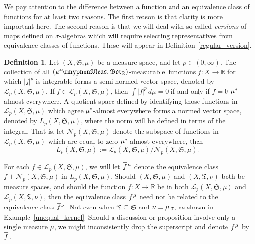 \documentclass[
twoside=true,
paper=letter,
fontsize=9pt,
pagesize=auto,
leqno,
openany,
headsepline,
overfullrule,
]{scrbook}
\theoremstyle{plain}
\theoremstyle{plain}
\theoremstyle{definition}
\newtheorem{defn}[thm]{Definition}
\theoremstyle{bfnoteitalic}
\theoremstyle{bfnoteroman}
\newcommand{\sigalg}[1]{\mathfrak{#1}}
\newcommand{\cali}[1]{\mathscr{#1}}
\newcommand{\borel}{\mathfrak{Bor}}
\newcommand{\textsigma}{\hbox{\large{$\sigma$}}\kern-1pt}
\newcommand{\restrictedto}[1]{_{\lvert#1}\kern-1.5pt}
\newcommand{\abs}[1]{\left\vert#1\right\vert}
\newcommand{\R}{\mathbb{R}}
\newcommand{\semiring}{\sigalg{S}}
\newcommand{\semiringii}{\sigalg{T}}
\newcommand{\measurable}[1]{{#1}\mhyphen\mathfrak{Meas}}
\newcommand{\kernast}{\ast\kern-1pt}
\newcommand{\mbmeasurable}{$(\measurable{\measure^\kernast},\borel_\R)$\hyp{}measurable}
\newcommand{\measurespace}{X}
\newcommand{\measure}{\mu}
\newcommand{\measureii}{\nu}
\newcommand*\xbar[1]{%
   \hbox{%
     \vbox{%
       \hrule height 0.4pt %
       \kern0.4ex%
       \hbox{%
         \ensuremath{#1}%
       }%
     }%
   }%
}
\newcommand{\lebclass}[1]{\hspace{.5pt}\xbar{#1}\hspace{0.5pt}}
\newcommand{\ellclass}[2]{\lebclass{#1}^{#2}}
\begin{document}
We pay attention to the difference between a function and an equivalence class of functions for at least two reasons.  The first reason is that  clarity is more important here.  The second reason is that we will deal with so-called \emph{versions} of maps defined on \textsigma-algebras which will require selecting representatives from equivalence classes of functions. These will appear in Definition~\ref{regular_version}.


\begin{defn}\label{Lp}
Let $(\measurespace, \semiring, \measure)$ be a measure space, and let $p \in (0, \infty)$.
The collection of all \mbmeasurable\ functions $f:\measurespace\to\R$ for which $\abs{f}^p$ is integrable forms a semi-normed vector space, denoted by 
$\cali{L}_p(\measurespace, \semiring, \measure)$.
\index{Lp@$L_p(\measurespace, \semiring, \measure)$}
If $f\in\cali{L}_p(\measurespace, \semiring, \measure)$, then $\int\abs{f}^p\,d\measure=0$ if and only if $f = 0$ $\measure^\kernast$-almost everywhere.
A quotient space defined by identifying those functions in $\cali{L}_p(\measurespace, \semiring, \measure)$ which agree $\measure^\kernast$-almost everywhere forms a normed vector space, denoted by $L_p(\measurespace, \semiring, \measure)$, where the norm will be defined in terms of the integral. That is, let 
$\cali{N}_p(\measurespace, \semiring, \measure)$ denote the subspace of functions in 
$\cali{L}_p(\measurespace, \semiring, \measure)$ which are equal to zero $\measure^\kernast$-almost everywhere, then
\[
L_p(\measurespace, \semiring, \measure) :=
\cali{L}_p(\measurespace, \semiring, \measure)/
\cali{N}_p(\measurespace, \semiring, \measure).
\]


For each $f\in\cali{L}_p(\measurespace, \semiring, \measure)$, we will let $\ellclass{f}{\measure}$ denote the equivalence class $f + \cali{N}_p(\measurespace, \semiring, \measure)$ in 
$L_p(\measurespace, \semiring, \measure)$.  Should $(\measurespace, \semiring, \measure)$ and $(\measurespace, \semiringii, \measureii)$
both be measure spaces, and should the function $f:\measurespace\to\R$ be in  both 
$\cali{L}_p(\measurespace, \semiring, \measure)$ and
$\cali{L}_p(\measurespace, \semiringii, \measureii)$,
then the equivalence class $\ellclass{f}{\measure}$ need not be related to the equivalence class  
$\ellclass{f}{\measureii}$.
Not even when $\semiringii\subseteq\semiring$ and $\measureii=\measure\restrictedto{\semiringii}$, as shown in Example~\ref{unequal_kernel}.
Should a discussion or proposition involve only a single measure $\mu$, we might inconsistently drop the superscript and denote
$\ellclass{f}{\mu}$ by $\lebclass{f}$.


\end{defn}
\end{document}
